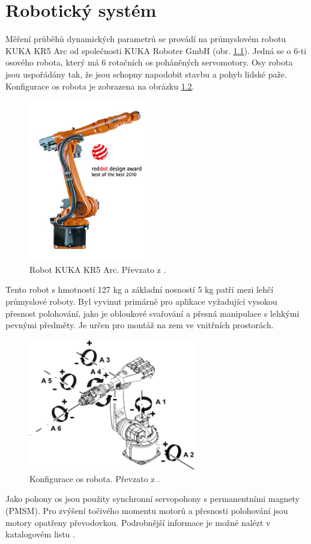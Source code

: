

\chapter{Robotický systém}



Měření průběhů dynamických parametrů se provádí na průmyslovém robotu KUKA KR5 Arc \cite{kuka_url} od společnosti KUKA Roboter GmbH (obr. \ref{kuka_kr5_pic}). Jedná se o 6-ti osového robota, který má 6 rotačních os poháněných servomotory. Osy robota jsou uspořádány tak, že jsou schopny napodobit stavbu a pohyb lidské paže. Konfigurace os robota je zobrazena na obrázku \ref{kuka_kr5_axes_pic}. 

\begin{figure}[ht]
\includegraphics[width=0.45\textwidth]{PR_KR5_arc_02}
\caption{Robot KUKA KR5 Arc. Převzato z \cite{kuka_datasheet_url}.}
\label{kuka_kr5_pic}
\end{figure}

Tento robot s hmotností 127 kg a základní nosností 5 kg patří mezi lehčí průmyslové roboty. Byl vyvinut primárně pro aplikace vyžadující vysokou přesnost polohování, jako je obloukové svařování a přesná manipulace s lehkými pevnými předměty. Je určen pro montáž na zem ve vnitřních prostorách.

\begin{figure}[ht]
\includegraphics[width=0.65\textwidth]{kuka_kr5_axes}
\caption{Konfigurace os robota. Převzato z \cite{kuka_datasheet_url}.}
\label{kuka_kr5_axes_pic}
\end{figure}

Jako pohony os jsou použity synchronní servopohony s permanentními magnety (PMSM). Pro zvýšení točivého momentu motorů a přesnosti polohování jsou motory opatřeny převodovkou. Podrobnější informace je možné nalézt v katalogovém listu \cite{kuka_datasheet_url}.